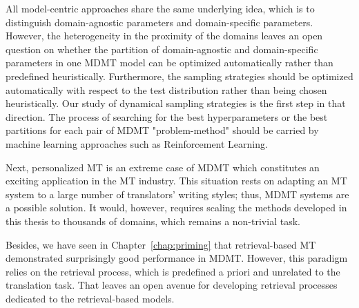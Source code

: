 All model-centric approaches share the same underlying idea, which is to distinguish domain-agnostic parameters and domain-specific parameters. However, the heterogeneity in the proximity of the domains leaves an open question on whether the partition of domain-agnostic and domain-specific parameters in one MDMT model can be optimized automatically rather than predefined heuristically. Furthermore, the sampling strategies should be optimized automatically with respect to the test distribution rather than being chosen heuristically. Our study of dynamical sampling strategies is the first step in that direction. The process of searching for the best hyperparameters or the best partitions for each pair of MDMT "problem-method" should be carried by machine learning approaches such as Reinforcement Learning.

Next, personalized MT is an extreme case of MDMT \citep{Michel18extreme} which constitutes an exciting application in the MT industry. This situation rests on adapting an MT system to a large number of translators' writing styles; thus, MDMT systems are a possible solution. It would, however, requires scaling the methods developed in this thesis to thousands of domains, which remains a non-trivial task.

Besides, we have seen in Chapter~\ref{chap:priming} that retrieval-based MT demonstrated surprisingly good performance in MDMT. However, this paradigm relies on the retrieval process, which is predefined a priori and unrelated to the translation task. That leaves an open avenue for developing retrieval processes dedicated to the retrieval-based models.

